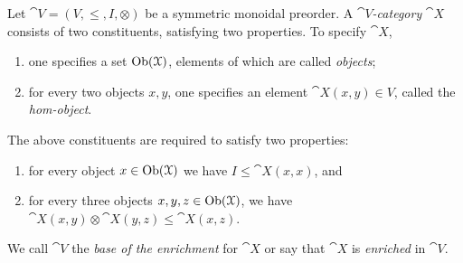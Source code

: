\documentclass[7Sketches]{subfiles}
\begin{document}
\begin{definition}%
\label{def.cat_enriched_mpos}%
Let $\cat{V}=(V,\leq,I,\otimes)$ be a symmetric monoidal preorder. A \emph{$\cat{V}$-category} $\cat{X}$ consists of two constituents, satisfying two properties. To specify $\cat{X}$, 
\begin{enumerate}[label=(\roman*)]
	\item one specifies a set $\operatorname{Ob}(\mathcal{X})$, elements of which are called \emph{objects};
	\item for every two objects $x,y$, one specifies an element $\cat{X}(x,y)\in V$, called the \emph{hom-object}.%
\end{enumerate}
%
%
%
The above constituents are required to satisfy two properties:
\begin{enumerate}[label=(\alph*)]
	\item for every object $x\in\operatorname{Ob}(\mathcal{X})$ we have $I\leq\cat{X}(x,x)$, and
	\item for every three objects $x,y,z\in\operatorname{Ob}(\mathcal{X})$, we have $\cat{X}(x,y)\otimes\cat{X}(y,z)\leq\cat{X}(x,z)$.
\end{enumerate}
We call $\cat{V}$ the \emph{base of the enrichment} for $\cat{X}$ or say that
$\cat{X}$ is \emph{enriched} in $\cat{V}$.%
\end{definition}
\end{document}
